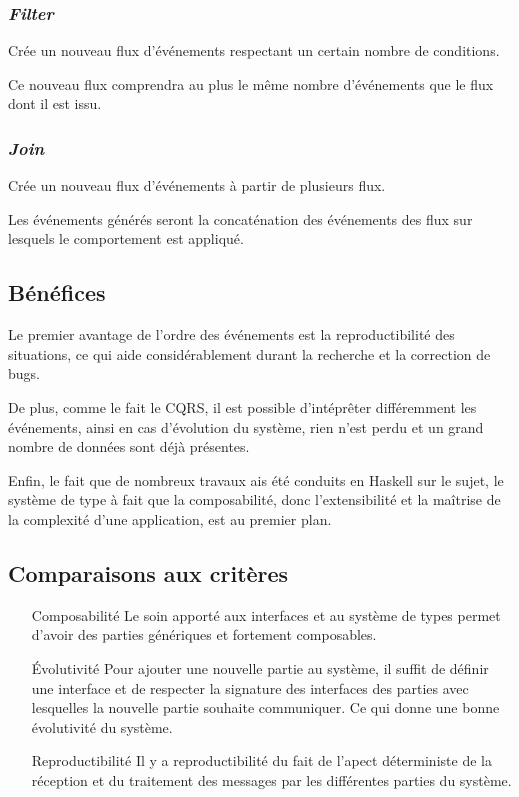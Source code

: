 \documentclass{article}
\begin{document}
\subsubsection{\emph{Filter}}
Crée un nouveau flux d'événements respectant un certain nombre de conditions.

Ce nouveau flux comprendra au plus le même nombre d'événements que le flux dont
il est issu.

\subsubsection{\emph{Join}}
Crée un nouveau flux d'événements à partir de plusieurs flux.

Les événements générés seront la concaténation des événements des flux sur lesquels
le comportement est appliqué.

\subsection{Bénéfices}\label{bénéfices-1}

Le premier avantage de l'ordre des événements est la reproductibilité
des situations, ce qui aide considérablement durant la recherche et la
correction de bugs.

De plus, comme le fait le CQRS, il est possible d'intéprêter différemment
les événements, ainsi en cas d'évolution du système, rien n'est perdu et
un grand nombre de données sont déjà présentes.

Enfin, le fait que de nombreux travaux ais été conduits en Haskell sur
le sujet, le système de type à fait que la composabilité, donc
l'extensibilité et la maîtrise de la complexité d'une application, est
au premier plan.

\subsection{Comparaisons aux critères}
\begin{itemize}
    \item[Composabilité] Le soin apporté aux interfaces et au système de types
permet d'avoir des parties génériques et fortement composables.
    \item[Évolutivité] Pour ajouter une nouvelle partie au système, il suffit de
définir une interface et de respecter la signature des interfaces des parties
avec lesquelles la nouvelle partie souhaite communiquer. Ce qui donne une bonne
évolutivité du système.
    \item[Reproductibilité] Il y a reproductibilité du fait de l'apect déterministe
de la réception et du traitement des messages par les différentes parties du système.
\end{itemize}
\end{document}
